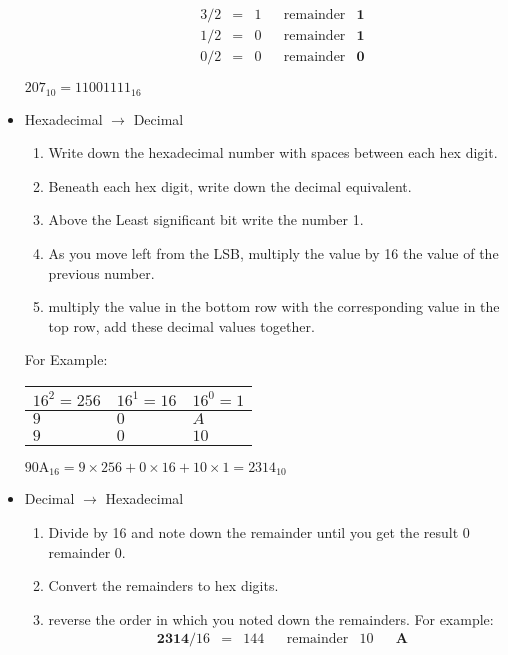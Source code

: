 \begin{itemize}
\begin{enumerate}
\begin{align*}
          & 3/2 & = & 1 & & \textrm{remainder} & \textbf{1} \\
          & 1/2 & = & 0 & & \textrm{remainder} & \textbf{1} \\
          & 0/2 & = & 0 & & \textrm{remainder} & \textbf{0}
        \end{align*}
      \end{enumerate}
      \subitem $ 207_{10} = 11001111_{16} $
    \item Hexadecimal $ \to $ Decimal
      \begin{enumerate}
        \setlength{\itemsep}{0em}
        \item Write down the hexadecimal number with spaces between each hex digit.
        \item Beneath each hex digit, write down the decimal equivalent.
        \item Above the Least significant bit write the number 1.
        \item As you move left from the LSB, multiply the value by 16 the value of the previous number.
        \item multiply the value in the bottom row with the corresponding value in the top row, add these decimal values together.
      \end{enumerate}
      \subitem For Example:
      \begin{table}[h]
        \centering
        \begin{tabular}{ C{1cm} C{1cm} C{1cm} }
          $ 16^2 = 256 $ & $ 16^1 = 16 $ & $ 16^0 = 1 $ \\
          \hline
          $ 9 $ & $ 0 $ & $ A $ \\
          $ 9 $ & $ 0 $ & $ 10 $
        \end{tabular}
      \end{table}
      \subitem $ 90\textrm{A}_{16} = 9 \times 256 + 0 \times 16 + 10 \times 1 = 2314_{10} $
    \item Decimal $ \to $ Hexadecimal
      \begin{enumerate}
        \item Divide by 16 and note down the remainder until you get the result 0 remainder 0.
        \item Convert the remainders to hex digits.
        \item reverse the order in which you noted down the remainders. For example:
        \begin{align*}
          & \textbf{2314}/16 & = & 144 & & \textrm{remainder} & 10 & & \textbf{A}\\

\end{align*}
\end{enumerate}
\end{itemize}
